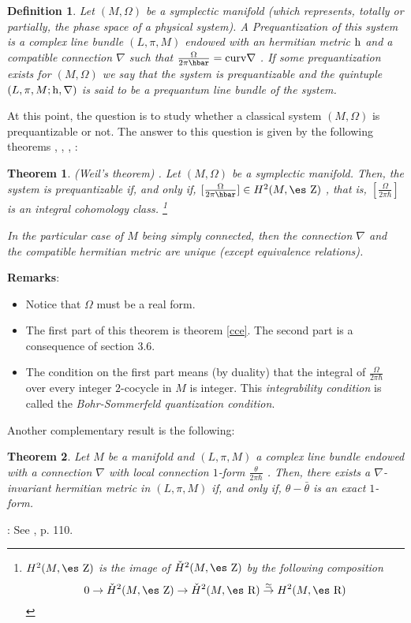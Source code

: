 \documentclass[12pt]{article}
\theoremstyle{plain}
\newtheorem{teor}{Theorem}
\newtheorem{definition}{Definition}
\def\dst{\(}
\def\map#1{\mathrel{\mathop{\to}\limits^{#1}}}
\def\qed{\ifvmode\removelastskip\fi
{\unskip\nobreak\hfil\penalty50\hbox{}\nobreak\hfil
\hbox{\vrule height1.2ex width1.2ex}\parfillskip=0pt
\finalhyphendemerits=0 \par\smallskip}}
\def\h{{\rm h}}
\def\Zahl{\mbox{\es Z}}
\def\Real{\mbox{\es R}}
\begin{document}
\begin{definition}
Let $(M,\Omega )$ be a symplectic manifold
(which represents, totally or partially,
the phase space of a physical system).
A {\rm Prequantization} of this system is a complex line bundle
$(L,\pi ,M)$ endowed with an hermitian metric $\h$
and a compatible connection $\nabla$ such that
\dst\frac{\Omega}{2\pi\hbar} = {\rm curv} \nabla\) .
If some prequantization exists for $(M,\Omega )$
we say that the system is {\rm prequantizable}
and the quintuple $(L,\pi ,M;\h ,\nabla )$
is said to be a {\rm prequantum line bundle} of the system.
\label{prequan}
\end{definition}

At this point, the question is
to study whether a classical system $(M,\Omega )$ is prequantizable or
not.
The answer to this question is given
by the following theorems
\cite{AM-78}, \cite{Ko-70}, \cite{SW-76}, \cite{Sn-80}:

\begin{teor}
{\rm (Weil's theorem) \cite{We-58}}.
Let $(M,\Omega )$ be a symplectic manifold.
Then, the system is prequantizable
if, and only if, \dst[\frac{\Omega}{2\pi\hbar}] \in H^2(M,\Zahl )\) ,
that is, \dst[\frac{\Omega}{2\pi\hbar}]\)
is an {\it integral cohomology class}.%
\footnote{
$H^2(M,\Zahl )$ is the image of $\check H^2(M,\Zahl )$
by the following composition
$$
0 \to \check H^2(M,\Zahl ) \to \check H^2(M,\Real ) \map{\simeq}
H^2(M,\Real)
$$
}

In the particular case of $M$ being simply connected,
then the connection $\nabla$ and the compatible hermitian metric
are unique (except equivalence relations).
\label{weil}
\end{teor}

{\bf Remarks}:
\begin{itemize}
\item
Notice that $\Omega$ must be a real form.
\item
The first part of this theorem is theorem \ref{cce}.
The second part is a consequence of section 3.6.
\item
The condition on the first part means (by duality) that the
integral of \dst\frac{\Omega}{2\pi\hbar}\) over every integer
$2$-cocycle in $M$ is integer. This {\it integrability condition}
is called the {\it Bohr-Sommerfeld quantization condition}.
\end{itemize}

Another complementary result is the following:

\begin{teor}
Let $M$ be a manifold and
$(L,\pi ,M)$ a complex line bundle
endowed with a connection $\nabla$
with local connection $1$-form \dst\frac{\theta}{2\pi\hbar}\) .
Then, there exists a $\nabla$-invariant
hermitian metric in $(L,\pi ,M)$
if, and only if, $\theta -\bar \theta$ is an exact $1$-form.
\label{ihm}
\end{teor}
: See \cite{Ko-70}, p. 110.
\qed
\end{document}
